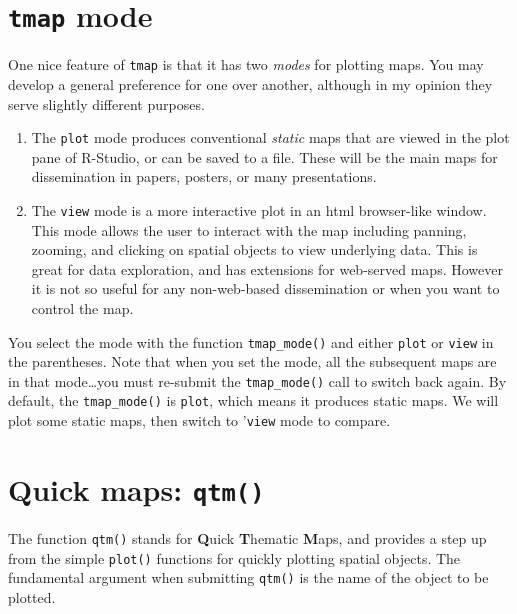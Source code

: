 \documentclass[
]{book}
\providecommand{\tightlist}{%
  \setlength{\itemsep}{0pt}\setlength{\parskip}{0pt}}
\begin{document}
\hypertarget{tmap-mode}{%
\section{\texorpdfstring{\texttt{tmap} mode}{tmap mode}}\label{tmap-mode}}

One nice feature of \texttt{tmap} is that it has two \emph{modes} for plotting maps. You may develop a general preference for one over another, although in my opinion they serve slightly different purposes.

\begin{enumerate}
\def\labelenumi{\arabic{enumi}.}
\tightlist
\item
  The \texttt{plot} mode produces conventional \emph{static} maps that are viewed in the plot pane of R-Studio, or can be saved to a file. These will be the main maps for dissemination in papers, posters, or many presentations.
\item
  The \texttt{view} mode is a more interactive plot in an html browser-like window. This mode allows the user to interact with the map including panning, zooming, and clicking on spatial objects to view underlying data. This is great for data exploration, and has extensions for web-served maps. However it is not so useful for any non-web-based dissemination or when you want to control the map.
\end{enumerate}

You select the mode with the function \texttt{tmap\_mode()} and either \texttt{\textquotesingle{}plot\textquotesingle{}} or \texttt{\textquotesingle{}view\textquotesingle{}} in the parentheses. Note that when you set the mode, all the subsequent maps are in that mode\ldots you must re-submit the \texttt{tmap\_mode()} call to switch back again. By default, the \texttt{tmap\_mode()} is \texttt{\textquotesingle{}plot\textquotesingle{}}, which means it produces static maps. We will plot some static maps, then switch to '\texttt{view\textquotesingle{}} mode to compare.

\hypertarget{qtm}{%
\section{\texorpdfstring{Quick maps: \texttt{qtm()}}{Quick maps: qtm()}}\label{qtm}}

The function \texttt{qtm()} stands for \textbf{Q}uick \textbf{T}hematic \textbf{M}aps, and provides a step up from the simple \texttt{plot()} functions for quickly plotting spatial objects. The fundamental argument when submitting \texttt{qtm()} is the name of the object to be plotted.
\end{document}
